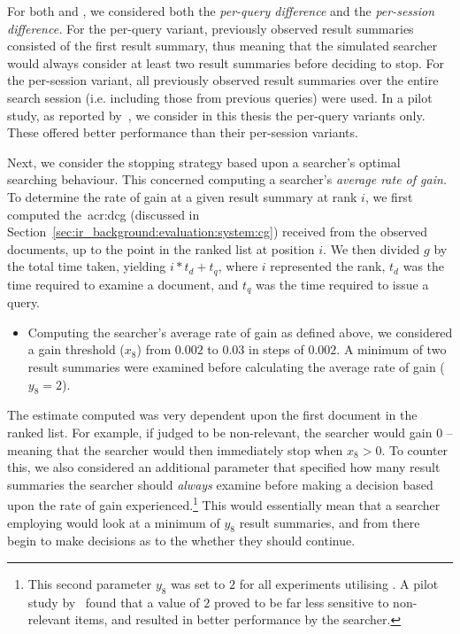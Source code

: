 
For both  and , we considered both the \emph{per-query difference} and the \emph{per-session difference.} For the per-query variant, previously observed result summaries consisted of the first result summary, thus meaning that the simulated searcher would always consider at least two result summaries before deciding to stop. For the per-session variant, all previously observed result summaries over the entire search session (i.e. including those from previous queries) were used. In a pilot study, as reported by~\cite{maxwell2015initial_stopping}, we consider in this thesis the per-query variants only. These offered better performance than their per-session variants.

Next, we consider the stopping strategy based upon a searcher's optimal searching behaviour. This concerned computing a searcher's \emph{average rate of gain.} To determine the rate of gain at a given result summary at rank $i$, we first computed the~\gls{acr:dcg} (discussed in Section~\ref{sec:ir_background:evaluation:system:cg}) received from the observed documents, up to the point in the ranked list at position $i$. We then divided $g$ by the total time taken, yielding $i * t_d + t_q$, where $i$ represented the rank, $t_d$ was the time required to examine a document, and $t_q$ was the time required to issue a query.

\begin{itemize}
    \item{ Computing the searcher's average rate of gain as defined above, we considered a gain threshold ($x_8$) from $0.002$ to $0.03$ in steps of $0.002$. A minimum of two result summaries were examined before calculating the average rate of gain ($y_8=2$).}
\end{itemize}

The estimate computed was very dependent upon the first document in the ranked list. For example, if judged to be non-relevant, the searcher would gain $0$ -- meaning that the searcher would then immediately stop when $x_8 > 0$. To counter this, we also considered an additional parameter that specified how many result summaries the searcher should \emph{always} examine before making a decision based upon the rate of gain experienced.\footnote{This second parameter $y_8$ was set to $2$ for all experiments utilising . A pilot study by~\cite{maxwell2015stopping_strategies} found that a value of $2$ proved to be far less sensitive to non-relevant items, and resulted in better performance by the searcher.} This would essentially mean that a searcher employing  would look at a minimum of $y_8$ result summaries, and from there begin to make decisions as to the whether they should continue.


